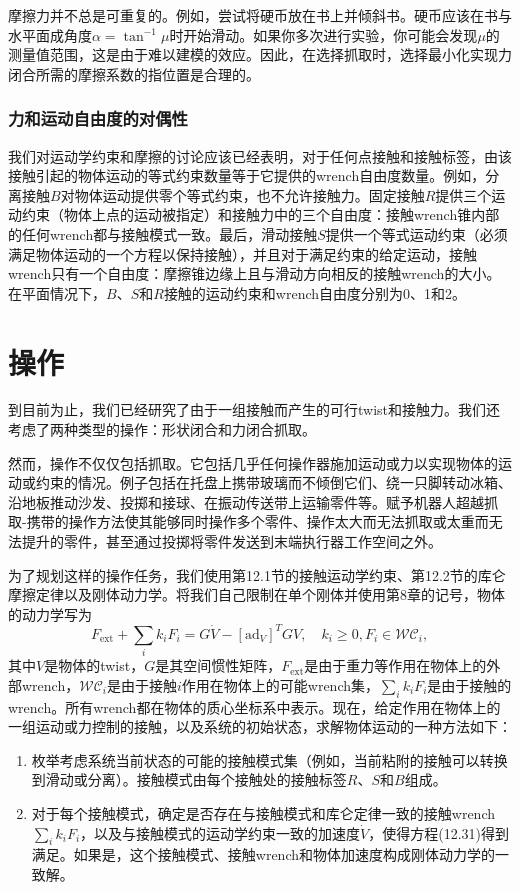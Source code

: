 \documentclass[12pt,a4paper]{article}
\begin{document}
摩擦力并不总是可重复的。例如，尝试将硬币放在书上并倾斜书。硬币应该在书与水平面成角度$\alpha = \tan^{-1} \mu$时开始滑动。如果你多次进行实验，你可能会发现$\mu$的测量值范围，这是由于难以建模的效应。因此，在选择抓取时，选择最小化实现力闭合所需的摩擦系数的指位置是合理的。

\subsubsection{力和运动自由度的对偶性}
\label{subsubsec:duality_force_motion}

我们对运动学约束和摩擦的讨论应该已经表明，对于任何点接触和接触标签，由该接触引起的物体运动的等式约束数量等于它提供的wrench自由度数量。例如，分离接触$B$对物体运动提供零个等式约束，也不允许接触力。固定接触$R$提供三个运动约束（物体上点的运动被指定）和接触力中的三个自由度：接触wrench锥内部的任何wrench都与接触模式一致。最后，滑动接触$S$提供一个等式运动约束（必须满足物体运动的一个方程以保持接触），并且对于满足约束的给定运动，接触wrench只有一个自由度：摩擦锥边缘上且与滑动方向相反的接触wrench的大小。在平面情况下，$B$、$S$和$R$接触的运动约束和wrench自由度分别为0、1和2。

\section{操作}
\label{sec:manipulation}

到目前为止，我们已经研究了由于一组接触而产生的可行twist和接触力。我们还考虑了两种类型的操作：形状闭合和力闭合抓取。

然而，操作不仅仅包括抓取。它包括几乎任何操作器施加运动或力以实现物体的运动或约束的情况。例子包括在托盘上携带玻璃而不倾倒它们、绕一只脚转动冰箱、沿地板推动沙发、投掷和接球、在振动传送带上运输零件等。赋予机器人超越抓取-携带的操作方法使其能够同时操作多个零件、操作太大而无法抓取或太重而无法提升的零件，甚至通过投掷将零件发送到末端执行器工作空间之外。

为了规划这样的操作任务，我们使用第12.1节的接触运动学约束、第12.2节的库仑摩擦定律以及刚体动力学。将我们自己限制在单个刚体并使用第8章的记号，物体的动力学写为
\begin{equation}
F_{\text{ext}} + \sum_i k_i F_i = G \dot{V} - [\text{ad}_V]^T G V, \quad k_i \geq 0, F_i \in \mathcal{WC}_i,
\label{eq:12.31}
\end{equation}
其中$V$是物体的twist，$G$是其空间惯性矩阵，$F_{\text{ext}}$是由于重力等作用在物体上的外部wrench，$\mathcal{WC}_i$是由于接触$i$作用在物体上的可能wrench集，$\sum_i k_i F_i$是由于接触的wrench。所有wrench都在物体的质心坐标系中表示。现在，给定作用在物体上的一组运动或力控制的接触，以及系统的初始状态，求解物体运动的一种方法如下：
\begin{enumerate}
\item[(a)] 枚举考虑系统当前状态的可能的接触模式集（例如，当前粘附的接触可以转换到滑动或分离）。接触模式由每个接触处的接触标签$R$、$S$和$B$组成。
\item[(b)] 对于每个接触模式，确定是否存在与接触模式和库仑定律一致的接触wrench $\sum_i k_i F_i$，以及与接触模式的运动学约束一致的加速度$\dot{V}$，使得方程(12.31)得到满足。如果是，这个接触模式、接触wrench和物体加速度构成刚体动力学的一致解。
\end{enumerate}
\end{document}
